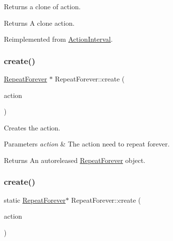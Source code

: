 Returns a clone of action.

\begin{DoxyReturn}{Returns}
A clone action. 
\end{DoxyReturn}


Reimplemented from \hyperlink{classActionInterval_abc93ce0c2f54a90eb216a7803f25f44a}{Action\+Interval}.

\mbox{\label{classRepeatForever_a989a199e93821bc2327f180fa7020f8e}} 
\subsubsection{\texorpdfstring{create()}{create()}\hspace{0.1cm}{\footnotesize\ttfamily [1/2]}}
{\footnotesize\ttfamily \hyperlink{classRepeatForever}{Repeat\+Forever} $\ast$ Repeat\+Forever\+::create (\begin{DoxyParamCaption}\item[{\hyperlink{classActionInterval}{Action\+Interval} $\ast$}]{action }\end{DoxyParamCaption})\hspace{0.3cm}{\ttfamily [static]}}

Creates the action.


\begin{DoxyParams}{Parameters}
{\em action} & The action need to repeat forever. \\
\hline
\end{DoxyParams}
\begin{DoxyReturn}{Returns}
An autoreleased \hyperlink{classRepeatForever}{Repeat\+Forever} object. 
\end{DoxyReturn}
\mbox{\label{classRepeatForever_a3f601f0eeedb3a4275cf3d12001088dd}} 
\subsubsection{\texorpdfstring{create()}{create()}\hspace{0.1cm}{\footnotesize\ttfamily [2/2]}}
{\footnotesize\ttfamily static \hyperlink{classRepeatForever}{Repeat\+Forever}$\ast$ Repeat\+Forever\+::create (\begin{DoxyParamCaption}\item[{\hyperlink{classActionInterval}{Action\+Interval} $\ast$}]{action }\end{DoxyParamCaption})\hspace{0.3cm}{\ttfamily [static]}}

